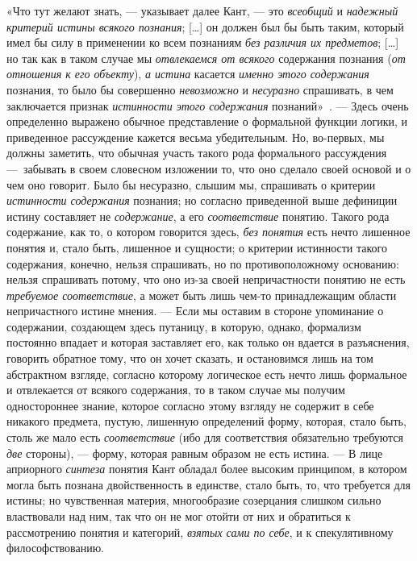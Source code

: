 \documentclass[twoside]{article}
\begin{document}
{{«Что тут желают знать, — указывает далее Кант,
— это {\em всеобщий}
и {\em надежный критерий
истины всякого познания}; […] он должен был бы быть таким,
который имел бы силу в применении ко всем познаниям
{\em без различия их предметов}; […]
но так как в таком случае мы
{\em отвлекаемся от всякого}
содержания познания
({\em от отношения к его объекту}),
{\em а истина} касается
{\em именно этого содержания}
познания, то было бы совершенно
{\em невозможно} и
{\em несуразно}
спрашивать, в чем заключается признак
{\em истинности этого содержания}
познаний»~\label{bkm:bm10}.
— Здесь очень определенно выражено обычное представление о
формальной функции логики, и приведенное рассуждение кажется весьма
убедительным. Но, во-первых, мы должны заметить, что обычная участь такого
рода формального рассуждения —~забывать в своем словесном
изложении то, что оно сделало своей основой и о чем оно говорит. Было бы
несуразно, слышим мы, спрашивать о критерии
{\em истинности содержания}
познания; но согласно приведенной выше дефиниции истину
составляет не {\em содержание},
а его {\em соответствие}
понятию. Такого рода содержание, как то, о котором говорится
здесь, {\em без понятия}
есть нечто лишенное понятия и, стало быть,
лишенное и сущности; о критерии истинности такого содержания, конечно,
нельзя спрашивать, но по противоположному основанию: нельзя спрашивать
потому, что оно из-за своей непричастности понятию не есть
{\em требуемое соответствие},
а может быть лишь чем-то принадлежащим области непричастного
истине мнения. — Если мы оставим в стороне упоминание о
содержании, создающем здесь путаницу, в которую, однако, формализм
постоянно впадает и которая заставляет его, как только он вдается в
разъяснения, говорить обратное тому, что он хочет сказать, и остановимся
лишь на том абстрактном взгляде, согласно которому логическое есть нечто
лишь формальное и отвлекается от всякого содержания, то в таком случае мы
получим одностороннее знание, которое согласно этому взгляду не содержит в
себе никакого предмета, пустую, лишенную определений форму, которая, стало
быть, столь же мало есть
{\em соответствие} (ибо
для соответствия обязательно требуются
{\em две} стороны), —
форму, которая равным образом не есть истина. —
В лице априорного
{\em синтеза} понятия
Кант обладал более высоким принципом, в котором могла быть познана
двойственность в единстве, стало быть, то, что требуется для истины; но
чувственная материя, многообразие созерцания слишком сильно властвовали над
ним, так что он не мог отойти от них и обратиться к рассмотрению понятия и
категорий, {\em взятых сами по себе},
и к спекулятивному философствованию.

}}
\end{document}
